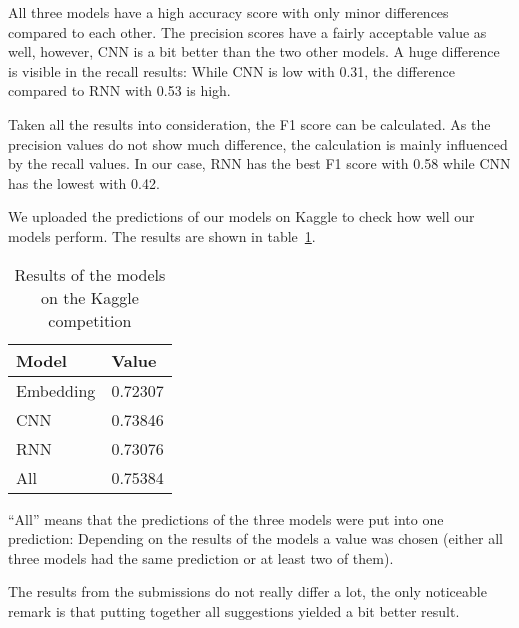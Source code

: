 \documentclass[runningheads]{llncs}
\begin{document}
\newpage
All three models have a high accuracy score with only minor differences compared to each other.
The precision scores have a fairly acceptable value as well, however, CNN is a bit better than the two other models.
A huge difference is visible in the recall results: While CNN is low with 0.31, the difference compared to RNN with 0.53 is high.

Taken all the results into consideration, the F1 score can be calculated. As the precision values do not show much difference, the calculation is mainly influenced by the recall values. In our case, RNN has the best F1 score with 0.58 while CNN has the lowest with 0.42.

We uploaded the predictions of our models on Kaggle \cite{ref_kaggle} to check how well our models perform. The results are shown in table~\ref{tab:kaggle-table}.

\begin{table}[]
\centering
\begin{tabular}{|l|l|}
\hline
\rowcolor[HTML]{C0C0C0} 
\textbf{Model} & \textbf{Value} \\ \hline
Embedding & 0.72307 \\ \hline
CNN & 0.73846 \\ \hline
RNN & 0.73076 \\ \hline
All & 0.75384 \\ \hline
\end{tabular}
\caption{Results of the models on the Kaggle competition}
\label{tab:kaggle-table}
\end{table}

``All'' means that the predictions of the three models were put into one prediction: Depending on the results of the models a value was chosen (either all three models had the same prediction or at least two of them).

The results from the submissions do not really differ a lot, the only noticeable remark is that putting together all suggestions yielded a bit better result.
\end{document}
